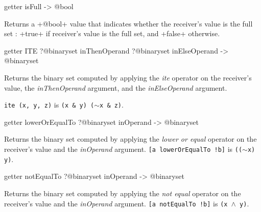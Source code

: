 
\begin{galgas3box}
getter isFull -> @bool
\end{galgas3box}

Returns a \ggst+@bool+ value that indicates whether the receiver's value is the full set : \ggst+true+ if receiver's value is the full set, and \ggst+false+ otherwise.








\begin{galgas3box}
getter ITE ?@binaryset inThenOperand ?@binaryset inElseOperand -> @binaryset
\end{galgas3box}


Returns the binary set computed by applying the \emph{ite} operator on the receiver's value, the \emph{inThenOperand} argument, and the  \emph{inElseOperand} argument.

{\texttt{ite (x, y, z)} is \texttt{(x \& y) \textbar ($\sim$x \& z)}.}








\begin{galgas3box}
getter lowerOrEqualTo ?@binaryset inOperand -> @binaryset
\end{galgas3box}


Returns the binary set computed by applying the \emph{lower or equal} operator on the receiver's value and the \emph{inOperand} argument.
{\texttt{[a lowerOrEqualTo !b]} is \texttt{(($\sim$x) \textbar y)}.}








\begin{galgas3box}
getter notEqualTo ?@binaryset inOperand -> @binaryset
\end{galgas3box}


Returns the binary set computed by applying the \emph{not equal} operator on the receiver's value and the \emph{inOperand} argument.
{\texttt{[a notEqualTo !b]} is \texttt{(x $\wedge$ y)}.}








